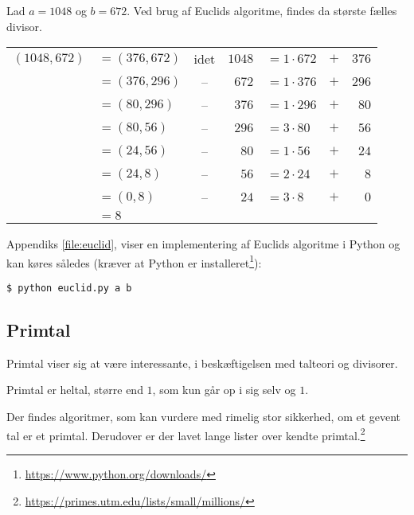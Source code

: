 \begin{eks}
    Lad \(a = 1048\) og \(b = 672\).
    Ved brug af Euclids algoritme, findes da største fælles divisor.
    \begin{center}
        \setlength{\tabcolsep}{5pt} %
        \begin{tabular}{r l c r l c r}
            \((1048, 672)\) & \(= (376, 672)\) & idet & \(1048\) & \(= 1 \cdot 672\) & \(+\) & \(376\)\\
                            & \(= (376, 296)\) & --   & \(672\) & \(= 1 \cdot 376\)  & \(+\) & \(296\)\\
                            & \(= (80, 296)\)  & --   & \(376\) & \(= 1 \cdot 296\)  & \(+\) & \(80\)\\
                            & \(= (80, 56)\)   & --   & \(296\) & \(= 3 \cdot 80\)   & \(+\) & \(56\)\\
                            & \(= (24, 56)\)   & --   & \(80\)  & \(= 1 \cdot 56\)   & \(+\) & \(24\)\\
                            & \(= (24, 8)\)    & --   & \(56\)  & \(= 2 \cdot 24\)   & \(+\) & \(8\)\\
                            & \(= (0, 8)\)     & --   & \(24\)  & \(= 3 \cdot 8\)    & \(+\) & \(0\)\\
                            & \(= 8\) & & & & &
        \end{tabular}
    \end{center}
\end{eks}
Appendiks \ref{file:euclid}, viser en implementering af Euclids algoritme i Python og kan køres således
(kræver at Python er installeret\footnote{\url{https://www.python.org/downloads/}}):
\begin{verbatim}
$ python euclid.py a b
\end{verbatim}


\subsection{Primtal}
Primtal viser sig at være interessante, i beskæftigelsen med talteori og divisorer.

\begin{definition}[Primtal]
    Primtal er heltal, større end \(1\), som kun går op i sig selv og \(1\).
\end{definition}

Der findes algoritmer, som kan vurdere med rimelig stor sikkerhed, om et gevent tal er et primtal.\cite[21]{vestergaard}
Derudover er der lavet lange lister over kendte primtal.\footnote{\url{https://primes.utm.edu/lists/small/millions/}}


